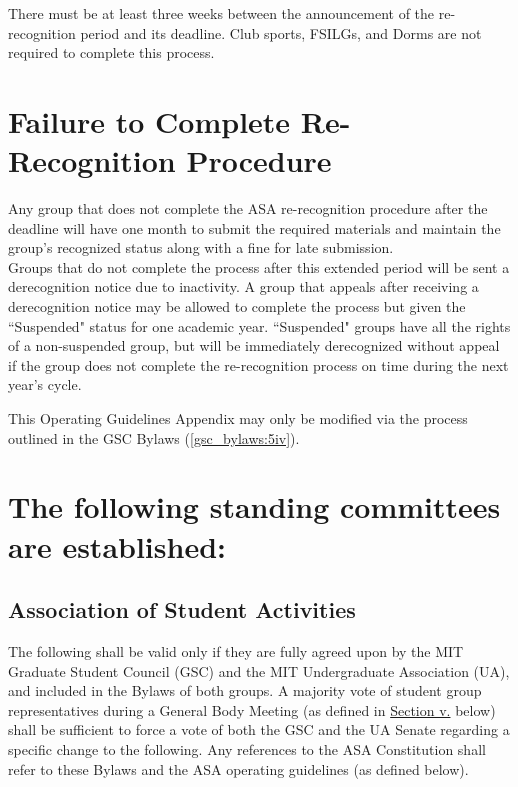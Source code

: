 \documentclass[12pt]{constitution}
\begin{document}
There must be at least three weeks between the announcement of the re-recognition period and its
    deadline. Club sports, FSILGs, and Dorms are not required to complete this process.

\section{Failure to Complete Re-Recognition Procedure}
Any group that does not complete the ASA re-recognition procedure after the deadline will have one
    month to submit the required materials and maintain the group's recognized status along with a
    fine for late submission.
\\

Groups that do not complete the process after this extended period will be sent a derecognition notice
    due to inactivity.
A group that appeals after receiving a derecognition notice may be allowed to complete the process
    but given the ``Suspended" status for one academic year.
``Suspended" groups have all the rights of a non-suspended group, but will be immediately derecognized
    without appeal if the group does not complete the re-recognition process on time during the next year's cycle.

This Operating Guidelines Appendix may only be modified via the process outlined in the GSC Bylaws (\ref{gsc_bylaws:5iv}).

\newpage

\label{app:C}

\setcounter{article}{1}

\setcounter{section}{6}
\let\secnum\Alph

\section{The following standing committees are established:}

\setcounter{subsection}{4}
\let\subsubnum\Roman
\subsection{Association of Student Activities}
The following shall be valid only if they are fully agreed upon by the MIT Graduate Student Council (GSC)
    and the MIT Undergraduate Association (UA), and included in the Bylaws of both groups.
A majority vote of student group representatives during a General Body Meeting
    (as defined in \hyperref[gbms]{Section v.} below) shall be sufficient to force a vote of both the GSC
    and the UA Senate regarding a specific change to the following.
Any references to the ASA Constitution shall refer to these Bylaws and the ASA operating guidelines (as defined below).
\end{document}
